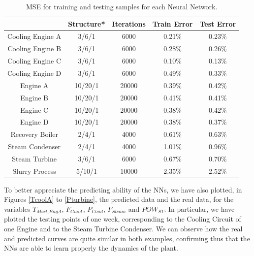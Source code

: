 \begin{table}[h]
  \centering
\caption{MSE for training and testing samples for each Neural Network.}
\label{MSE} %
\begin{tabular}{|c|c|c|c|c|}
  \hline
 & Structure* & Iterations & Train Error & Test Error \\
 \hline
Cooling Engine A & 3/6/1 & 6000 & 0.21\% & 0.23\% \\
 \hline
Cooling Engine B & 3/6/1 & 6000 & 0.28\% & 0.26\% \\
 \hline
Cooling Engine C & 3/6/1 & 6000 & 0.10\% & 0.13\% \\
 \hline
Cooling Engine D & 3/6/1 & 6000 & 0.49\% & 0.33\% \\
 \hline
 Engine A & 10/20/1 & 20000 & 0.39\% & 0.42\% \\
 \hline
 Engine B & 10/20/1 & 20000 & 0.41\% & 0.41\% \\
 \hline
 Engine C & 10/20/1 & 20000 & 0.38\% & 0.42\% \\
 \hline
 Engine D & 10/20/1 & 20000 & 0.38\% & 0.37\% \\
 \hline
 Recovery Boiler & 2/4/1 & 4000 & 0.61\% & 0.63\% \\
 \hline
 Steam Condenser & 2/4/1 & 4000 & 1.01\% & 0.96\% \\
 \hline
 Steam Turbine & 3/6/1 & 6000 & 0.67\% & 0.70\% \\
 \hline
 Slurry Process & 5/10/1 & 10000 & 2.35\% & 2.52\% \\
 \hline
\end{tabular}
\vspace{-0.3cm}

\end{table}


To better appreciate the predicting ability of the NNs, we have also plotted, in Figures \ref{TcoolA} to  \ref{Pturbine}, the predicted data and the real data, for the variables $T_{Mixt\_EngA}$, $F_{GasA}$, $P_{Cond}$, $F_{Steam}$ and $POW_{ST}$. In particular, we have plotted the testing points of one week, corresponding to the Cooling Circuit of one Engine and to the Steam Turbine Condenser. We can observe how the  real and predicted curves are quite similar in both examples, confirming thus that the NNs are able to learn properly the dynamics of the plant. 


